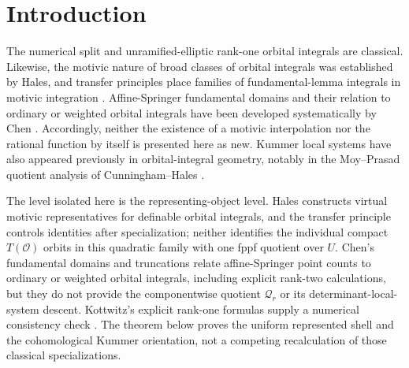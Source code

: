 \documentclass[11pt]{article}
\theoremstyle{definition}
\theoremstyle{remark}
\newcommand{\Qell}{\mathbf Q_\ell}
\begin{document}
\begin{abstract}
We then pass from the represented $PGL_2$ family to a second, explicitly
local level.  For central-neutral standard spherical families in unramified
absolute type $A_1$, a classification reduction and an orbit-summed measure
lemma exhaust the possible reduced-building shell lattices.  The $SL_2$
elliptic phases retain only even or odd spheres, whereas adjoining the
connected center in $U_2$ forces deletion of the central cocharacter
direction.  Nevertheless every case satisfies
\[
 W_G(z^{-1})=-z\,(\mathfrak o_{G,T}\otimes d_S)W_G(z),\qquad
 \mathfrak o_{G,T}
 =\det\!\left(X_*(T/Z(G)^\circ)\otimes\Qell\right).
\]
Outside the saturated $PGL_2$ family this is a local orbit-summed theorem,
not a relative fppf representability statement.  No whole affine-Springer
quotient, cross-shell incidence, convolution, Rees completion, or general
logarithmic skeletonization theorem is claimed.
\end{abstract}

\section{Introduction}

The numerical split and unramified-elliptic rank-one orbital integrals are
classical.  Likewise, the motivic nature of broad classes of orbital
integrals was established by Hales, and transfer principles place families
of fundamental-lemma integrals in motivic integration
\cite{HalesMotivic,CluckersHalesLoeser}.  Affine-Springer fundamental domains
and their relation to ordinary or weighted orbital integrals have been
developed systematically by Chen
\cite{ChenFundamentalDomain,ChenWeighted,ChenLocalBehavior}.  Accordingly,
neither the existence of a motivic interpolation nor the rational function
by itself is presented here as new.  Kummer local systems have also appeared
previously in orbital-integral geometry, notably in the Moy--Prasad quotient
analysis of Cunningham--Hales \cite{CunninghamHalesGood}.

The level isolated here is the representing-object level.
Hales constructs virtual motivic representatives for definable orbital
integrals, and the transfer principle controls identities after
specialization; neither identifies the individual compact $T(\mathcal O)$
orbits in this quadratic family with one fppf quotient over $U$.  Chen's
fundamental domains and truncations relate affine-Springer point counts to
ordinary or weighted orbital integrals, including explicit rank-two
calculations, but they do not provide the componentwise quotient
$\mathscr Q_r$ or its determinant-local-system descent.  Kottwitz's explicit
rank-one formulas supply a numerical consistency check
\cite{KottwitzOrbital}.  The theorem below proves the uniform represented shell
and the cohomological Kummer orientation, not a competing recalculation of
those classical specializations.
\end{document}
